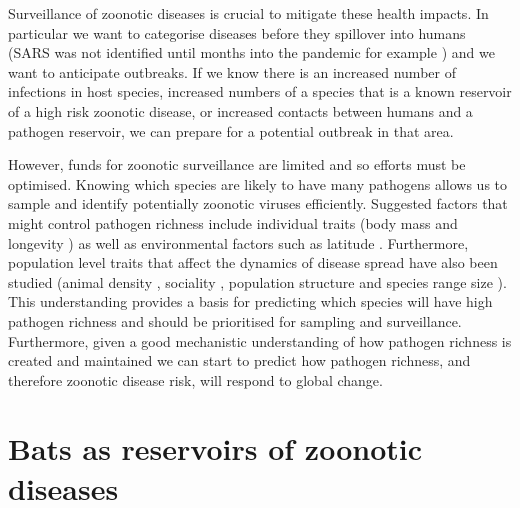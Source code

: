 
Surveillance of zoonotic diseases is crucial to mitigate these health impacts.
In particular we want to categorise diseases before they spillover into humans (SARS was not identified until months into the pandemic for example \cite{drosten2003identification}) and we want to anticipate outbreaks. 
If we know there is an increased number of infections in host species, increased numbers of a species that is a known reservoir of a high risk zoonotic disease, or increased contacts between humans and a pathogen reservoir, we can prepare for a potential outbreak in that area.

However, funds for zoonotic surveillance are limited and so efforts must be optimised.
Knowing which species are likely to have many pathogens allows us to sample and identify potentially zoonotic viruses efficiently.
Suggested factors that might control pathogen richness include individual traits (body mass \cite{kamiya2014determines, arneberg2002host, poulin1995phylogeny} and longevity \cite{nunn2003comparative, ezenwa2006host}) as well as environmental factors such as latitude \cite{poulin2010latitudinal, kamiya2014determines}.
Furthermore, population level traits that affect the dynamics of disease spread have also been studied (animal density \cite{kamiya2014determines, nunn2003comparative, arneberg2002host}, sociality \cite{bordes2007rodent, vitone2004body, altizer2003social, ezenwa2006host}, population structure \cite{nunes2006localized, maganga2014bat, gay2014parasite, turmelle2009correlates} and  species range size \cite{kamiya2014determines, nunn2003comparative}).
This understanding provides a basis for predicting which species will have high pathogen richness and should be prioritised for sampling and surveillance.
Furthermore, given a good mechanistic understanding of how pathogen richness is created and maintained we can start to predict how pathogen richness, and therefore zoonotic disease risk, will respond to global change.




\section{Bats as reservoirs of zoonotic diseases}


